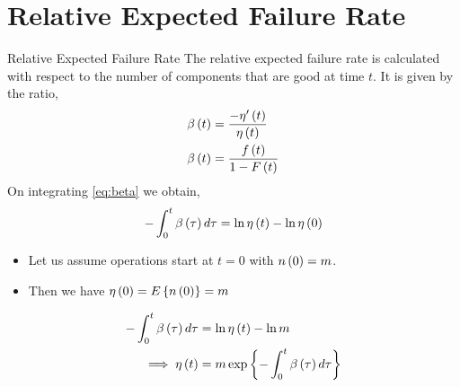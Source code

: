 \documentclass{beamer}
\begin{document}
\section{Relative Expected Failure Rate}
\begin{frame}{Relative Expected Failure Rate}
    The relative expected failure rate is calculated with respect to the number of components that are good at time $t$. It is given by the ratio,
    \begin{align}
        \beta\left(t\right) &= \frac{-\eta'\left(t\right)} {\eta\left(t\right)} 
        \label{eq:beta} \\
        \beta\left(t\right) &= \frac{f\left(t\right)}{1- F\left(t\right)} 
    \end{align}
    On integrating \eqref{eq:beta} we obtain,
    \begin{align}
        - \int_0^t \beta\left(\tau\right) d\tau = \ln{\eta\ensuremath{\left(t\right)}} - \ln{\eta\ensuremath{\left(0\right)}} 
    \end{align}
\end{frame}
%
\begin{frame}{}
    \begin{itemize}
        \item Let us assume operations start at $t=0$ with $n\left(0\right)=m$.
        \item Then we have $ \eta\left(0\right) = E\left\{n\left(0\right)\right\} = m$
    \end{itemize}
    \begin{align}
        - \int_0^t \beta\left(\tau\right) d\tau &= \ln{\eta\ensuremath{\left(t\right)}} - \ln{m} \\
     \implies  \eta\left(t\right) &= m \exp{\ensuremath{\left\{- \int_0^t \beta\left(\tau\right) d\tau\right\}} }
    \end{align}
\end{frame}
\end{document}
